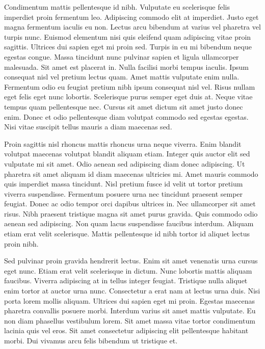 \documentclass[11pt,a4paper]{article}
\begin{document}
Condimentum mattis pellentesque id nibh. Vulputate eu scelerisque felis imperdiet proin fermentum leo. Adipiscing commodo elit at imperdiet. Justo eget magna fermentum iaculis eu non. Lectus arcu bibendum at varius vel pharetra vel turpis nunc. Euismod elementum nisi quis eleifend quam adipiscing vitae proin sagittis. Ultrices dui sapien eget mi proin sed. Turpis in eu mi bibendum neque egestas congue. Massa tincidunt nunc pulvinar sapien et ligula ullamcorper malesuada. Sit amet est placerat in. Nulla facilisi morbi tempus iaculis. Ipsum consequat nisl vel pretium lectus quam. Amet mattis vulputate enim nulla. Fermentum odio eu feugiat pretium nibh ipsum consequat nisl vel. Risus nullam eget felis eget nunc lobortis. Scelerisque purus semper eget duis at. Neque vitae tempus quam pellentesque nec. Cursus sit amet dictum sit amet justo donec enim. Donec et odio pellentesque diam volutpat commodo sed egestas egestas. Nisi vitae suscipit tellus mauris a diam maecenas sed.

Proin sagittis nisl rhoncus mattis rhoncus urna neque viverra. Enim blandit volutpat maecenas volutpat blandit aliquam etiam. Integer quis auctor elit sed vulputate mi sit amet. Odio aenean sed adipiscing diam donec adipiscing. Ut pharetra sit amet aliquam id diam maecenas ultricies mi. Amet mauris commodo quis imperdiet massa tincidunt. Nisl pretium fusce id velit ut tortor pretium viverra suspendisse. Fermentum posuere urna nec tincidunt praesent semper feugiat. Donec ac odio tempor orci dapibus ultrices in. Nec ullamcorper sit amet risus. Nibh praesent tristique magna sit amet purus gravida. Quis commodo odio aenean sed adipiscing. Non quam lacus suspendisse faucibus interdum. Aliquam etiam erat velit scelerisque. Mattis pellentesque id nibh tortor id aliquet lectus proin nibh.

Sed pulvinar proin gravida hendrerit lectus. Enim sit amet venenatis urna cursus eget nunc. Etiam erat velit scelerisque in dictum. Nunc lobortis mattis aliquam faucibus. Viverra adipiscing at in tellus integer feugiat. Tristique nulla aliquet enim tortor at auctor urna nunc. Consectetur a erat nam at lectus urna duis. Nisi porta lorem mollis aliquam. Ultrices dui sapien eget mi proin. Egestas maecenas pharetra convallis posuere morbi. Interdum varius sit amet mattis vulputate. Eu non diam phasellus vestibulum lorem. Sit amet massa vitae tortor condimentum lacinia quis vel eros. Sit amet consectetur adipiscing elit pellentesque habitant morbi. Dui vivamus arcu felis bibendum ut tristique et.
\end{document}
